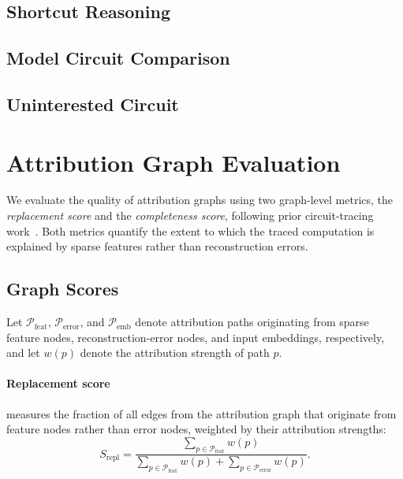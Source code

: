 \documentclass{article}
\begin{document}
\subsection{Shortcut Reasoning}

\subsection{Model Circuit Comparison}

\subsection{Uninterested Circuit}



\section{Attribution Graph Evaluation}
\label{sec:attribution_graph_evaluation}

We evaluate the quality of attribution graphs using two graph-level metrics,
the \emph{replacement score} and the \emph{completeness score}, following prior
circuit-tracing work~\citep{ameisen2025circuit,shu2026completereplacement}.
Both metrics quantify the extent to which the traced computation is explained
by sparse features rather than reconstruction errors.

\subsection{Graph Scores}

Let $\mathcal{P}_{\mathrm{feat}}$, $\mathcal{P}_{\mathrm{error}}$, and
$\mathcal{P}_{\mathrm{emb}}$ denote attribution paths originating from sparse
feature nodes, reconstruction-error nodes, and input embeddings, respectively,
and let $w(p)$ denote the attribution strength of path $p$.

\paragraph{Replacement score} measures the fraction of all edges from the attribution graph 
that originate from feature nodes rather than error nodes, weighted by their attribution 
strengths:
\begin{equation}
S_{\mathrm{repl}}
=
\frac{
    \sum_{p \in \mathcal{P}_{\mathrm{feat}}} w(p)
}{
    \sum_{p \in \mathcal{P}_{\mathrm{feat}}} w(p)
    +
    \sum_{p \in \mathcal{P}_{\mathrm{error}}} w(p)
}.
\label{eq:replacement_score}
\end{equation}
\end{document}
